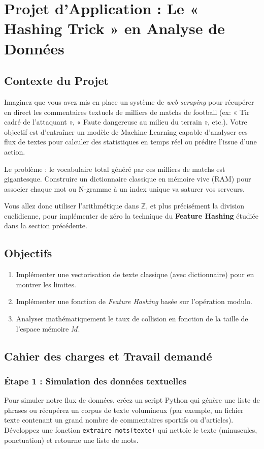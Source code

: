 \section*{Projet d'Application : Le « Hashing Trick » en Analyse de Données}

\subsection*{Contexte du Projet}
Imaginez que vous avez mis en place un système de \textit{web scraping} pour récupérer en direct les commentaires textuels de milliers de matchs de football (ex: « Tir cadré de l'attaquant », « Faute dangereuse au milieu du terrain », etc.). Votre objectif est d'entraîner un modèle de Machine Learning capable d'analyser ces flux de textes pour calculer des statistiques en temps réel ou prédire l'issue d'une action.

Le problème : le vocabulaire total généré par ces milliers de matchs est gigantesque. Construire un dictionnaire classique en mémoire vive (RAM) pour associer chaque mot ou N-gramme à un index unique va saturer vos serveurs. 

Vous allez donc utiliser l'arithmétique dans $\mathbb{Z}$, et plus précisément la division euclidienne, pour implémenter de zéro la technique du \textbf{Feature Hashing} étudiée dans la section précédente.

\subsection*{Objectifs}
\begin{enumerate}
    \item Implémenter une vectorisation de texte classique (avec dictionnaire) pour en montrer les limites.
    \item Implémenter une fonction de \textit{Feature Hashing} basée sur l'opération modulo.
    \item Analyser mathématiquement le taux de collision en fonction de la taille de l'espace mémoire $M$.
\end{enumerate}

\subsection*{Cahier des charges et Travail demandé}

\subsubsection*{Étape 1 : Simulation des données textuelles}
Pour simuler notre flux de données, créez un script Python qui génère une liste de phrases ou récupérez un corpus de texte volumineux (par exemple, un fichier texte contenant un grand nombre de commentaires sportifs ou d'articles).
Développez une fonction \texttt{extraire\_mots(texte)} qui nettoie le texte (minuscules, ponctuation) et retourne une liste de mots.

